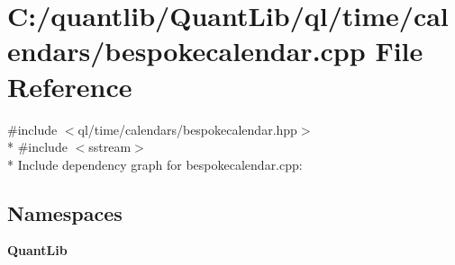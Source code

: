 \section{C\+:/quantlib/\+Quant\+Lib/ql/time/calendars/bespokecalendar.cpp File Reference}
\label{bespokecalendar_8cpp}
{\ttfamily \#include $<$ql/time/calendars/bespokecalendar.\+hpp$>$}\\*
{\ttfamily \#include $<$sstream$>$}\\*
Include dependency graph for bespokecalendar.\+cpp\+:
\subsection*{Namespaces}
\begin{DoxyCompactItemize}
\item 
 {\bf Quant\+Lib}
\end{DoxyCompactItemize}

